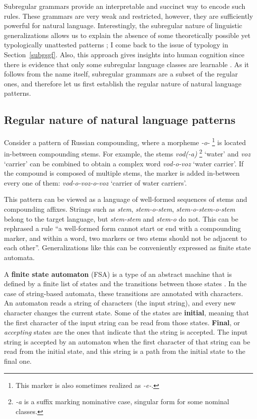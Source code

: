 Subregular grammars provide an interpretable and succinct way to encode such rules.
These grammars are very weak and restricted, however, they are sufficiently powerful for natural language.
Interestingly, the subregular nature of linguistic generalizations allows us to explain the absence of some theoretically possible yet typologically unattested patterns \citep{GainorLai12}; I come back to the issue of typology in Section~\ref{subgsgf}.
Also, this approach gives insights into human cognition since there is evidence that only some subregular language classes are learnable \citep{Lai15}.
As it follows from the name itself, subregular grammars are a subset of the regular ones, and therefore let us first establish the regular nature of natural language patterns.



\subsection{Regular nature of natural language patterns}
\label{regnatofnlpt}

Consider a pattern of Russian compounding, where a morpheme \emph{-o-}%
\footnote{This marker is also sometimes realized as \emph{-e-}.}
 is located in-between compounding stems.
For example, the stems \emph{vod(-a)}%
\footnote{\emph{-a} is a suffix marking nominative case, singular form for some nominal classes.}
 `water' and \emph{voz} `carrier' can be combined to obtain a complex word \emph{vod-o-voz} `water carrier'.
If the compound is composed of multiple stems, the marker is added in-between every one of them: \emph{vod-o-voz-o-voz} `carrier of water carriers'.

This pattern can be viewed as a language of well-formed sequences of stems and compounding affixes.
Strings such as \emph{stem}, \emph{stem-o-stem}, \emph{stem-o-stem-o-stem} belong to the target language, but \emph{stem-stem} and \emph{stem-o} do not.
This can be rephrased a rule ``a well-formed form cannot start or end with a compounding marker, and within a word, two markers or two stems should not be adjacent to each other''.
Generalizations like this can be conveniently expressed as finite state automata.

A \textbf{finite state automaton} (FSA) is a type of an abstract machine that is defined by a finite list of states and the transitions between those states \citep{Lawson2003}.
In the case of string-based automata, these transitions are annotated with characters.
An automaton reads a string of characters (the input string), and every new character changes the current state.
Some of the states are \textbf{initial}, meaning that the first character of the input string can be read from those states.
\textbf{Final}, or \emph{accepting} states are the ones that indicate that the string is accepted.
The input string is accepted by an automaton when the first character of that string can be read from the initial state, and this string is a path from the initial state to the final one.

